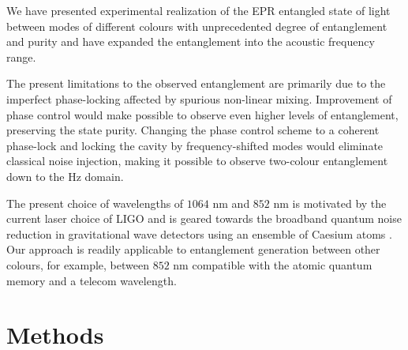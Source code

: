 \documentclass[final,twocolumn,english,prl,notitlepage,nofootinbib,floatfix,longbibliography,superscriptaddress
]{revtex4-2}
\begin{document}
We have presented experimental realization of the EPR entangled state of light between modes of different colours with unprecedented degree of entanglement and purity and have expanded the entanglement into the acoustic frequency range.\par
The present limitations to the observed entanglement are primarily due to the imperfect phase-locking affected by spurious non-linear mixing. Improvement of phase control would make possible to observe even higher levels of entanglement, preserving the state purity. Changing the phase control scheme to a coherent phase-lock \cite{Vahlbruch2006} and locking the cavity by frequency-shifted modes would eliminate classical noise injection, making it possible to observe two-colour entanglement down to the Hz domain.\par
The present choice of wavelengths of $1064$ nm and $852$ nm is motivated by the current laser choice of LIGO and is geared towards the broadband quantum noise reduction in gravitational wave detectors using an ensemble of Caesium atoms \cite{Khalili2018,Zeuthen2019}. Our approach is readily applicable to entanglement generation between other colours, for example, between $852$ nm compatible with the atomic quantum memory and a telecom wavelength.




\clearpage

\section*{Methods}
\end{document}
